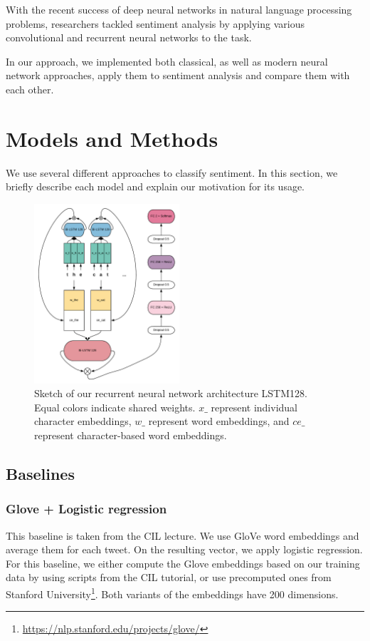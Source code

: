 \documentclass[10pt,conference,compsocconf]{IEEEtran}
\begin{document}
With the recent success of deep neural networks in natural language processing problems, researchers tackled sentiment analysis by applying various convolutional \cite{TextCNN} and recurrent neural networks \cite{rnn} to the task. 

In our approach, we implemented both classical, as well as modern neural network approaches, apply them to sentiment analysis and compare them with each other.

\section{Models and Methods}

We use several different approaches to classify sentiment. In this section, we briefly describe each model and explain our motivation for its usage.

\begin{figure}
\includegraphics[width=0.48\textwidth]{./rnn}
\caption{Sketch of our recurrent neural network architecture LSTM128. Equal colors indicate shared weights. $x\_$ represent individual character embeddings, $w\_$ represent word embeddings, and $ce\_$ represent character-based word embeddings.}
\label{fig:arch}
\end{figure}

\subsection{Baselines}

\subsubsection{Glove + Logistic regression}
This baseline is taken from the CIL lecture. We use GloVe word embeddings \cite{pennington2014glove} and average them for each tweet. On the resulting vector, we apply logistic regression. For this baseline, we either compute the Glove embeddings based on our training data by using scripts from the CIL tutorial, or use precomputed ones from Stanford University\footnote{\url{https://nlp.stanford.edu/projects/glove/}}.
Both variants of the embeddings have 200 dimensions.
\end{document}
